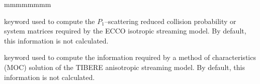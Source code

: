 \begin{ListeDeDescription}{mmmmmmmm}
\item[\moc{ECCO}] keyword used to compute the $P_1$--scattering reduced
collision probability or system matrices required by the ECCO isotropic
streaming model. By default, this information is not calculated.

\item[\moc{HETE}] keyword used to compute the information required by a
method of characteristics (MOC) solution of the TIBERE anisotropic
streaming model. By default, this information is not calculated.

\end{ListeDeDescription}
\eject
